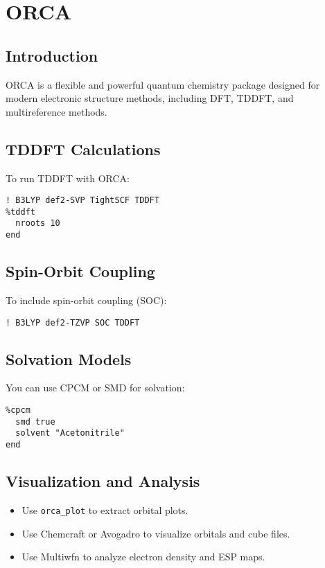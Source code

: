 \chapter{ORCA}

\section{Introduction}

ORCA is a flexible and powerful quantum chemistry package designed for modern electronic structure methods, including DFT, TDDFT, and multireference methods.

\section{TDDFT Calculations}

To run TDDFT with ORCA:

\begin{verbatim}
! B3LYP def2-SVP TightSCF TDDFT
%tddft
  nroots 10
end
\end{verbatim}

\section{Spin-Orbit Coupling}

To include spin-orbit coupling (SOC):

\begin{verbatim}
! B3LYP def2-TZVP SOC TDDFT
\end{verbatim}

\section{Solvation Models}

You can use CPCM or SMD for solvation:

\begin{verbatim}
%cpcm
  smd true
  solvent "Acetonitrile"
end
\end{verbatim}

\section{Visualization and Analysis}

\begin{itemize}
  \item Use \texttt{orca\_plot} to extract orbital plots.
  \item Use Chemcraft or Avogadro to visualize orbitals and cube files.
  \item Use Multiwfn to analyze electron density and ESP maps.
\end{itemize}

